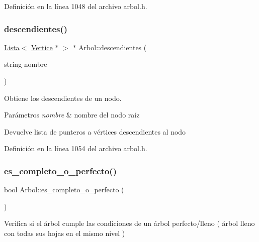 Definición en la línea 1048 del archivo arbol.\+h.

\mbox{\label{classArbol_a790b07f284b14bd179499eb4a991ad86}} 
\subsubsection{\texorpdfstring{descendientes()}{descendientes()}\hspace{0.1cm}{\footnotesize\ttfamily [2/2]}}
{\footnotesize\ttfamily \hyperlink{classLista}{Lista}$<$ \hyperlink{classVertice}{Vertice} $\ast$ $>$ $\ast$ Arbol\+::descendientes (\begin{DoxyParamCaption}\item[{string}]{nombre }\end{DoxyParamCaption})}



Obtiene los descendientes de un nodo. 


\begin{DoxyParams}{Parámetros}
{\em nombre} & nombre del nodo raíz \\
\hline
\end{DoxyParams}
\begin{DoxyReturn}{Devuelve}
lista de punteros a vértices descendientes al nodo 
\end{DoxyReturn}


Definición en la línea 1054 del archivo arbol.\+h.

\mbox{\label{classArbol_a9e472df85f3bb1aa5c90f8157ad6ff22}} 
\subsubsection{\texorpdfstring{es\+\_\+completo\+\_\+o\+\_\+perfecto()}{es\_completo\_o\_perfecto()}}
{\footnotesize\ttfamily bool Arbol\+::es\+\_\+completo\+\_\+o\+\_\+perfecto (\begin{DoxyParamCaption}{ }\end{DoxyParamCaption})}



Verifica si el árbol cumple las condiciones de un árbol perfecto/lleno ( árbol lleno con todas sus hojas en el mismo nivel ) 

